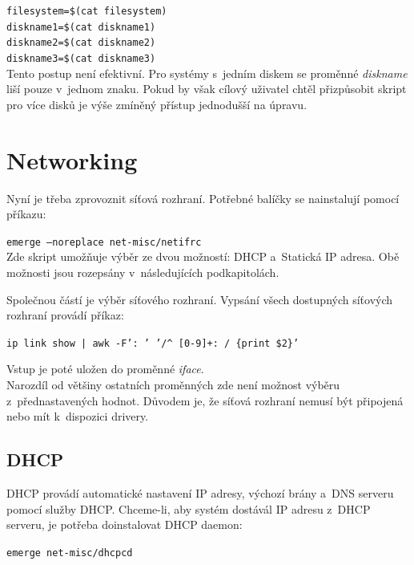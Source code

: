 \documentclass[12pt,a4paper,twoside,]{article}
\begin{document}
{{{{{{\texttt{filesystem=\$(cat filesystem)}\\
\hspace*{1.5em}\texttt{diskname1=\$(cat diskname1)}\\
\hspace*{1.5em}\texttt{diskname2=\$(cat diskname2)}\\
\hspace*{1.5em}\texttt{diskname3=\$(cat diskname3)}\\

\hspace*{-1.5em}Tento postup není efektivní. Pro systémy s~jedním diskem se proměnné \textit{diskname} liší pouze v~jednom znaku. Pokud by však cílový uživatel chtěl přizpůsobit skript pro více disků je výše zmíněný přístup jednodušší na úpravu.
\newpage

\section{\textsf{Networking}}
Nyní je třeba zprovoznit síťová rozhraní. Potřebné balíčky se nainstalují pomocí příkazu:

\texttt{emerge --noreplace net-misc/netifrc}\\


\hspace{-1.5em}Zde skript umožňuje výběr ze dvou možností: DHCP a~Statická IP adresa. Obě možnosti jsou rozepsány v~následujících podkapitolách.

\hspace{-1.5em}Společnou částí je výběr síťového rozhraní. Vypsání všech dostupných síťových rozhraní provádí příkaz:

\texttt{ip link show | awk -F': ' '/\^~{[}0-9{]}+: / \{print \$2\}'}

\hspace{-1.5em}Vstup je poté uložen do proměnné \textit{iface}.	\\
Narozdíl od většiny ostatních proměnných zde není možnost výběru z~přednastavených hodnot. Důvodem je, že síťová rozhraní nemusí být připojená nebo mít k~dispozici drivery.
\subsection{\textsf{DHCP}}
DHCP provádí automatické nastavení IP adresy, výchozí brány a~DNS serveru pomocí služby DHCP.
Chceme-li, aby systém dostávál IP adresu z~DHCP serveru, je potřeba doinstalovat DHCP daemon:

\texttt{emerge net-misc/dhcpcd}

}}}}}}
\end{document}
